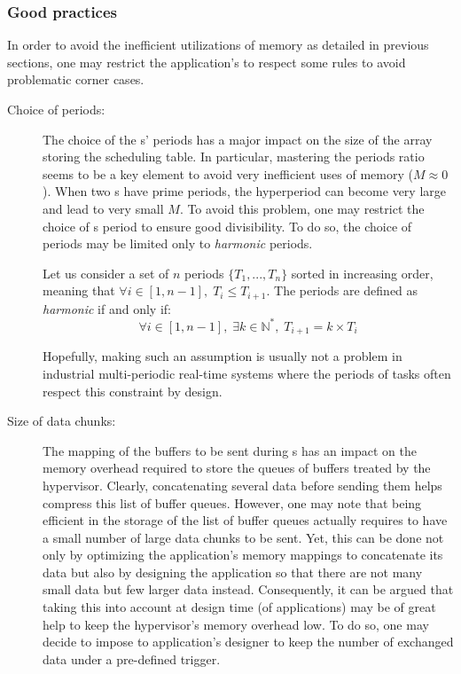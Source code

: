 \documentclass[main.tex]{subfiles}
\begin{document}
\subsubsection{Good practices}
\label{sssec_implemExecModel_goodPractices}
In order to avoid the inefficient utilizations of memory as detailed in
previous sections, one may restrict the application's to respect some rules to
avoid problematic corner cases.
\begin{description}
    \item[Choice of periods: ] The choice of the \PC{}s' periods has a major
        impact on the size of the array storing the scheduling table. In
        particular, mastering the periods ratio seems to be a key element to
        avoid very inefficient uses of memory ($M \approx 0$). When two \PC{}s
        have prime periods, the hyperperiod can become very large and lead to
        very small $M$. To avoid this problem, one may restrict the choice of
        \PC{}s period to ensure good divisibility. To do so, the choice of
        periods may be limited only to \emph{harmonic} periods.

        \begin{definition}
            Let us consider a set of $n$ periods $\{ T_1, ..., T_n \}$ sorted
            in increasing order, meaning that $\forall i \in [1, n-1], \; T_i
            \leq T_{i+1}$. The periods are defined as \emph{harmonic} if and
            only if:
            \begin{displaymath}
                \forall i \in [1, n-1], \; \exists k \in \mathbb{N}^* , \; T_{i+1} = k \times T_i 
            \end{displaymath}
        \end{definition}

        Hopefully, making such an assumption is usually not a problem in
        industrial multi-periodic real-time systems where the periods of tasks
        often respect this constraint by design.

    \item[Size of data chunks: ] The mapping of the buffers to be sent during
        \PC{}s has an impact on the memory overhead required to store the
        queues of buffers treated by the hypervisor. Clearly, concatenating
        several data before sending them helps compress this list of buffer
        queues. However, one may note that being efficient in the storage of
        the list of buffer queues actually requires to have a small number of
        large data chunks to be sent. Yet, this can be done not only by
        optimizing the application's memory mappings to concatenate its data
        but also by designing the application so that there are not many small
        data but few larger data instead. Consequently, it can be argued that
        taking this into account at design time (of applications) may be of
        great help to keep the hypervisor's memory overhead low. To do so, one
        may decide to impose to application's designer to keep the number of
        exchanged data under a pre-defined trigger.


\end{description}
\end{document}
